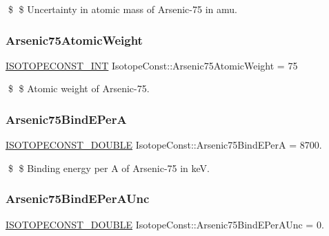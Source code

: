 \$ \$ Uncertainty in atomic mass of Arsenic-\/75 in amu. \mbox{\label{group___isotope_const-_arsenic-_as75_ga2bfb248a85c6697ec13e469915b8ff06}} 
\subsubsection{\texorpdfstring{Arsenic75\+Atomic\+Weight}{Arsenic75AtomicWeight}}
{\footnotesize\ttfamily \mbox{\hyperlink{group___isotope_const-_macros_ga5f18360b3e99483a35c32d789e62621c}{I\+S\+O\+T\+O\+P\+E\+C\+O\+N\+S\+T\+\_\+\+I\+NT}} Isotope\+Const\+::\+Arsenic75\+Atomic\+Weight = 75}

\$ \$ Atomic weight of Arsenic-\/75. \mbox{\label{group___isotope_const-_arsenic-_as75_ga2e469072c85f880824bfa5183e41ec3b}} 
\subsubsection{\texorpdfstring{Arsenic75\+Bind\+E\+PerA}{Arsenic75BindEPerA}}
{\footnotesize\ttfamily \mbox{\hyperlink{group___isotope_const-_macros_ga8f45a7272ce02c0b4c65c44636ed719a}{I\+S\+O\+T\+O\+P\+E\+C\+O\+N\+S\+T\+\_\+\+D\+O\+U\+B\+LE}} Isotope\+Const\+::\+Arsenic75\+Bind\+E\+PerA = 8700.}

\$ \$ Binding energy per A of Arsenic-\/75 in keV. \mbox{\label{group___isotope_const-_arsenic-_as75_gac9b51939486927a840a20bb6ca1bf58b}} 
\subsubsection{\texorpdfstring{Arsenic75\+Bind\+E\+Per\+A\+Unc}{Arsenic75BindEPerAUnc}}
{\footnotesize\ttfamily \mbox{\hyperlink{group___isotope_const-_macros_ga8f45a7272ce02c0b4c65c44636ed719a}{I\+S\+O\+T\+O\+P\+E\+C\+O\+N\+S\+T\+\_\+\+D\+O\+U\+B\+LE}} Isotope\+Const\+::\+Arsenic75\+Bind\+E\+Per\+A\+Unc = 0.}

